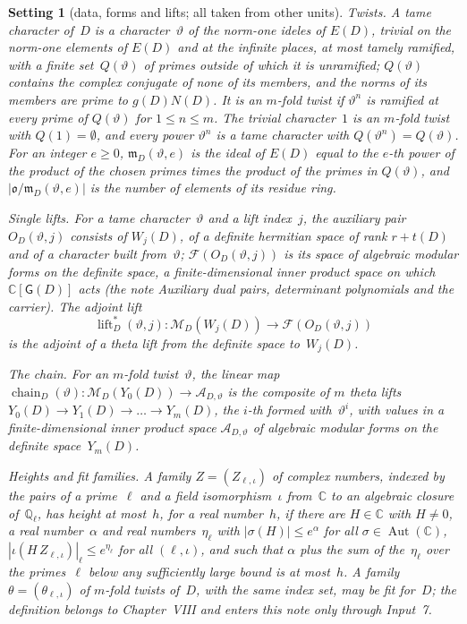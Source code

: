 \documentclass[11pt,a4paper]{article}
\newcommand{\kw}[1]{\emph{#1}}
\newcommand{\m}[1]{\mbox{$#1$}}        %
\theoremstyle{plainx}
\theoremstyle{uprightx}
\newtheorem{setting}[theorem]{Setting}          %
\newcommand{\CC}{\mathbb{C}}
\newcommand{\AutC}{\operatorname{Aut}(\CC)}
\newcommand{\Mf}{\mathcal{M}}
\newcommand{\Ff}{\mathcal{F}}
\newcommand{\alift}{\operatorname{lift}^{*}}
\newcommand{\chain}{\operatorname{chain}}
\newcommand{\sfG}{\mathsf{G}}
\begin{document}
\begin{setting}[data, forms and lifts; all taken from other units]
\emph{Twists.} A \kw{tame character} of~$D$ is a character~$\vartheta$ of the norm-one ideles of \m{E(D)}, trivial
on the norm-one elements of \m{E(D)} and at the infinite places, at most tamely ramified, with a finite
set~\m{Q(\vartheta)} of primes outside of which it is unramified; \m{Q(\vartheta)} contains the complex conjugate
of none of its members, and the norms of its members are prime to \m{g(D)N(D)}. It is an \kw{$m$-fold twist} if
$\vartheta^{n}$ is ramified at every prime of \m{Q(\vartheta)} for \m{1\le n\le m}. The trivial character~$1$ is
an $m$-fold twist with \m{Q(1)=\emptyset}, and every power $\vartheta^{n}$ is a tame character with
\m{Q(\vartheta^{n})=Q(\vartheta)}. For an integer \m{e\ge0}, \m{\mathfrak{m}_D(\vartheta,e)} is the ideal of
\m{E(D)} equal to the $e$-th power of the product of the chosen primes times the product of the primes in
\m{Q(\vartheta)}, and \m{|\mathfrak{o}/\mathfrak{m}_D(\vartheta,e)|} is the number of elements of its residue ring.

\emph{Single lifts.} For a tame character~$\vartheta$ and a lift index~$j$, the \kw{auxiliary pair}
\m{O_D(\vartheta,j)} consists of $W_j(D)$, of a definite hermitian space of rank \m{r+t(D)} and of a character
built from~$\vartheta$; \m{\Ff(O_D(\vartheta,j))} is its space of algebraic modular forms on the definite space, a
finite-dimensional inner product space on which \m{\CC[\sfG(D)]} acts (the note \emph{Auxiliary dual pairs,
determinant polynomials and the carrier}). The \kw{adjoint lift}
\[\alift_D(\vartheta,j)\colon\Mf_D(W_j(D))\longrightarrow\Ff(O_D(\vartheta,j))\]
is the adjoint of a theta lift from the definite space to~$W_j(D)$.

\emph{The chain.} For an $m$-fold twist~$\vartheta$, the linear map
\m{\chain_D(\vartheta)\colon\Mf_D(Y_0(D))\to\mathcal{A}_{D,\vartheta}} is the composite of $m$ theta lifts
\m{Y_0(D)\to Y_1(D)\to\dots\to Y_m(D)}, the $i$-th formed with~$\vartheta^{i}$, with values in a finite-dimensional
inner product space $\mathcal{A}_{D,\vartheta}$ of algebraic modular forms on the definite space~$Y_m(D)$.

\emph{Heights and fit families.} A family \m{Z=(Z_{\ell,\iota})} of complex numbers, indexed by the pairs of a
prime~$\ell$ and a field isomorphism~$\iota$ from~$\CC$ to an algebraic closure of~$\mathbb{Q}_\ell$, has
\kw{height at most~$h$}, for a real number~$h$, if there are \m{H\in\CC} with \m{H\ne0}, a real number~$\alpha$
and real numbers~$\eta_\ell$ with \m{|\sigma(H)|\le e^{\alpha}} for all \m{\sigma\in\AutC},
\m{|\iota(H\,Z_{\ell,\iota})|_\ell\le e^{\eta_\ell}} for all \m{(\ell,\iota)}, and such that $\alpha$ plus the sum of
the~$\eta_\ell$ over the primes~$\ell$ below any sufficiently large bound is at most~$h$. A family
\m{\theta=(\theta_{\ell,\iota})} of $m$-fold twists of~$D$, with the same index set, may be \kw{fit for~$D$}; the
definition belongs to Chapter~VIII and enters this note only through Input~7.
\end{setting}
\end{document}
